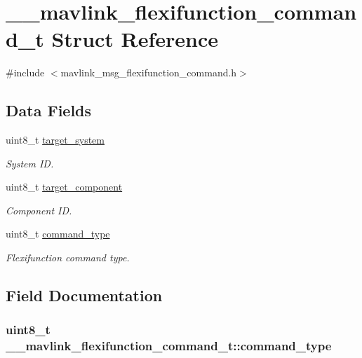 \hypertarget{struct____mavlink__flexifunction__command__t}{\section{\+\_\+\+\_\+mavlink\+\_\+flexifunction\+\_\+command\+\_\+t Struct Reference}
\label{struct____mavlink__flexifunction__command__t}
}


{\ttfamily \#include $<$mavlink\+\_\+msg\+\_\+flexifunction\+\_\+command.\+h$>$}

\subsection*{Data Fields}
\begin{DoxyCompactItemize}
\item 
uint8\+\_\+t \hyperlink{struct____mavlink__flexifunction__command__t_ab4990eb2808bcc3181ce8a6523fa9871}{target\+\_\+system}
\begin{DoxyCompactList}\small\item\em System I\+D. \end{DoxyCompactList}\item 
uint8\+\_\+t \hyperlink{struct____mavlink__flexifunction__command__t_adce2945a81ff12330230a7b9a284d965}{target\+\_\+component}
\begin{DoxyCompactList}\small\item\em Component I\+D. \end{DoxyCompactList}\item 
uint8\+\_\+t \hyperlink{struct____mavlink__flexifunction__command__t_ab1e417d6db7c56fbbec7d7028495a271}{command\+\_\+type}
\begin{DoxyCompactList}\small\item\em Flexifunction command type. \end{DoxyCompactList}\end{DoxyCompactItemize}


\subsection{Field Documentation}
\hypertarget{struct____mavlink__flexifunction__command__t_ab1e417d6db7c56fbbec7d7028495a271}{
\subsubsection[{command\+\_\+type}]{\setlength{\rightskip}{0pt plus 5cm}uint8\+\_\+t \+\_\+\+\_\+mavlink\+\_\+flexifunction\+\_\+command\+\_\+t\+::command\+\_\+type}}\label{struct____mavlink__flexifunction__command__t_ab1e417d6db7c56fbbec7d7028495a271}


